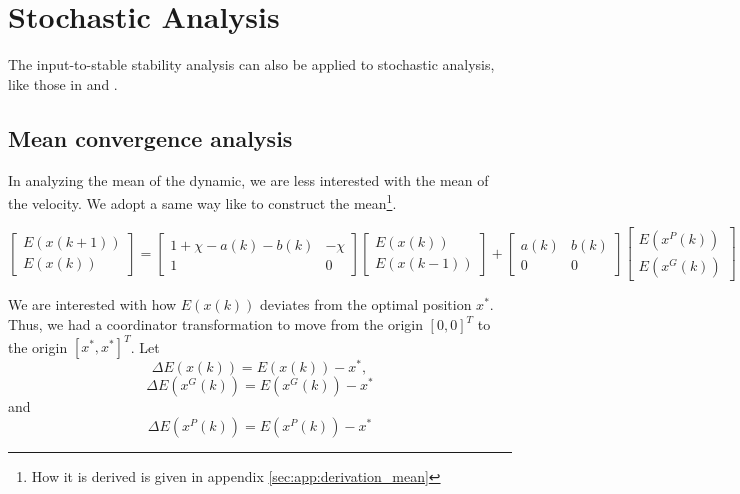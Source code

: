 \section{Stochastic Analysis}

The input-to-stable stability analysis can also be applied to stochastic analysis, like those in \cite{Jiang20078} and \cite{Poli:2008:DSS:1384929.1384944}.

\subsection{Mean convergence analysis}

In analyzing the mean of the dynamic, we are less interested with the mean of the velocity. 
We adopt a same way like \cite{Jiang2001857} to construct the mean\footnote{How it is derived is given in appendix \ref{sec:app:derivation_mean} }.

\begin{equation}
\label{eq:pso1_alg_mean_linalg:final}
\begin{bmatrix}
E( x(k+1) ) \\
E( x(k) )
\end{bmatrix}
=
\begin{bmatrix}
1 + \chi - a(k) - b(k) & -\chi \\
1 & 0
\end{bmatrix}
\begin{bmatrix}
E( x(k) ) \\
E( x(k-1) )
\end{bmatrix}
+
\begin{bmatrix}
a(k) & b(k) \\
0 & 0
\end{bmatrix}
\begin{bmatrix}
E( x^{P}(k) ) \\
E( x^{G}(k) )
\end{bmatrix}
\end{equation}

We are interested with how $ E( x(k) ) $ deviates from the optimal position $ x^{*} $.
Thus, we had a coordinator transformation to move from the origin $ [0, 0]^{T} $ to the origin $ [x^{*}, x^{*}]^{T} $.
Let
\begin{equation}
\label{eq:def_delta_ex}
\Delta E( x(k) ) = E( x(k) ) - x^{*},
\end{equation}
\begin{equation}
\label{eq:def_delta_exg}
\Delta E( x^{G}(k) ) = E( x^{G}(k) ) - x^{*}
\end{equation}
and
\begin{equation}
\label{eq:def_delta_exp}
\Delta E( x^{P}(k) ) = E( x^{P}(k) ) - x^{*}
\end{equation}

